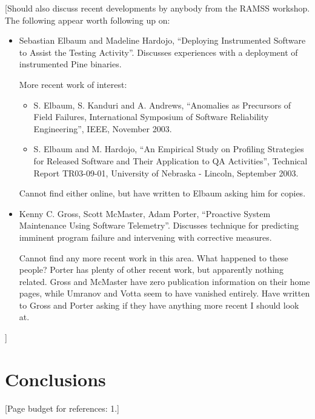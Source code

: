 \documentclass{acm_proc_article-sp}
\newcommand{\placeholder}[1]{{\color[cmyk]{0,0.61,0.87,0}[#1]}}
\begin{document}
\placeholder{Should also discuss recent developments by anybody from
  the RAMSS workshop.  The following appear worth following up on:

  \begin{itemize}
  \item Sebastian Elbaum and Madeline Hardojo, ``Deploying
    Instrumented Software to Assist the Testing Activity''.  Discusses
    experiences with a deployment of instrumented Pine binaries.

    More recent work of interest:

    \begin{itemize}
    \item S. Elbaum, S.  Kanduri and A. Andrews, ``Anomalies as
      Precursors of Field Failures, International Symposium of
      Software Reliability Engineering'', IEEE, November 2003.

    \item S. Elbaum and M. Hardojo, ``An Empirical Study on
      Profiling Strategies for Released Software and Their
      Application to QA Activities'', Technical Report TR03-09-01,
      University of Nebraska - Lincoln, September 2003.
    \end{itemize}

    Cannot find either online, but have written to Elbaum asking him
    for copies.

  \item Kenny C. Gross, Scott McMaster, Adam Porter, ``Proactive
    System Maintenance Using Software Telemetry''.  Discusses
    technique for predicting imminent program failure and
    intervening with corrective measures.

    Cannot find any more recent work in this area.  What happened to
    these people?  Porter has plenty of other recent work, but
    apparently nothing related.  Gross and McMaster have zero
    publication information on their home pages, while Umranov and
    Votta seem to have vanished entirely.  Have written to Gross and
    Porter asking if they have anything more recent I should look at.
    \end{itemize}}

\section{Conclusions}
\label{sec:conclusions}


\placeholder{Page budget for references: 1.}
\end{document}
